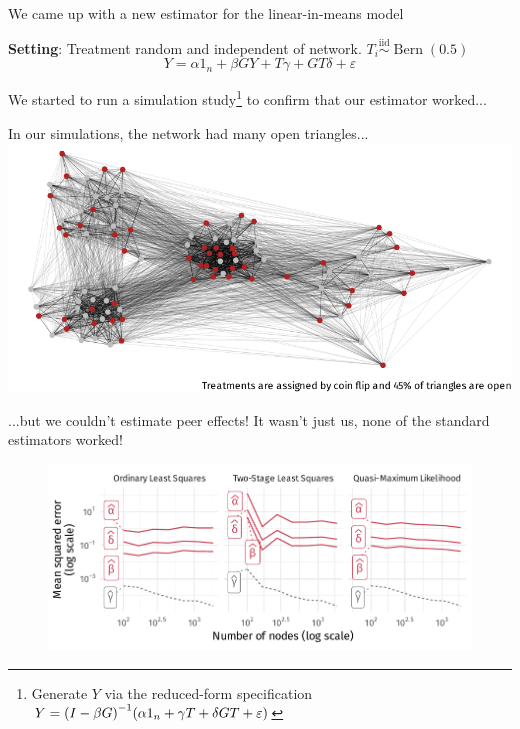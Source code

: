 \documentclass[aspectratio=169]{beamer}
\DeclarePairedDelimiter{\paren}{(}{)}
\newcommand \diid {\stackrel{\mathrm{iid}}{\sim}}
\DeclareMathOperator*{\Bern}{Bern}
\theoremstyle{remark}
\begin{document}
\begin{frame}{We came up with a new estimator for the linear-in-means model}
    
    \textbf{Setting}: Treatment random and independent of network. $T_i \diid \Bern(0.5)$ \\
    
    \Large
    \begin{equation*}
        Y = \alpha 1_n + \beta G Y + T \gamma + G T \delta + \varepsilon
    \end{equation*}
    
    \normalsize
    We started to run a simulation study\footnote{Generate $Y$ via the reduced-form specification $Y = \paren*{I - \beta G}^{-1} \paren*{\alpha 1_n + \gamma T + \delta G T + \varepsilon}$} to confirm that our estimator worked...
    
\end{frame}

\begin{frame}{In our simulations, the network had many open triangles...}
    \centering
    \includegraphics{./figures/simulations/jobtalk-backbone.pdf}
\end{frame}

\begin{frame}{...but we couldn't estimate peer effects!}
    It wasn't just us, none of the standard estimators worked!
    \begin{figure}
        \centering
        \includegraphics[width=\textwidth]{./figures/simulations/jobtalk-mse.pdf}
    \end{figure}
\end{frame}
\end{document}
